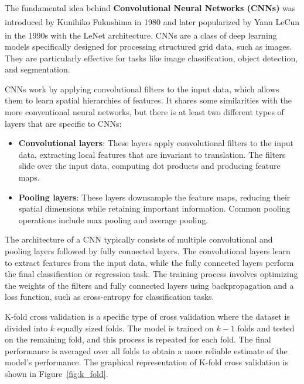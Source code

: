 The fundamental idea behind \textbf{Convolutional Neural Networks (CNNs)} was introduced by Kunihiko Fukushima\textsuperscript{\cite{Fukushima-1987}}
in 1980 and later popularized by Yann LeCun in the 1990s with the LeNet architecture\textsuperscript{\cite{Lecun-et-al-1998}}. CNNs are a class of
deep learning models specifically designed for processing structured grid data, such as images. They are particularly effective for
tasks like image classification, object detection, and segmentation.

CNNs work by applying convolutional filters to the input data, which allows them to learn spatial hierarchies of features.
It shares some similarities with the more conventional neural networks, but there is at least two different types
of layers that are specific to CNNs:

\begin{itemize}
	\item \textbf{Convolutional layers}: These layers apply convolutional filters to the input data, extracting local features
	      that are invariant to translation. The filters slide over the input data, computing dot products and producing feature maps.
	\item \textbf{Pooling layers}: These layers downsample the feature maps, reducing their spatial dimensions while retaining important
	      information. Common pooling operations include max pooling and average pooling.
\end{itemize}

The architecture of a CNN typically consists of multiple convolutional and pooling layers followed by fully connected layers.
The convolutional layers learn to extract features from the input data, while the fully connected layers perform the final classification
or regression task. The training process involves optimizing the weights of the filters and fully connected layers using backpropagation
and a loss function, such as cross-entropy for classification tasks.

\label{subsubsec:k_fold_cross_validation}

K-fold cross validation is a specific type of cross validation where the dataset is divided into $k$ equally sized folds. The model is trained
on $k-1$ folds and tested on the remaining fold, and this process is repeated for each fold. The final performance is averaged over all folds
to obtain a more reliable estimate of the model's performance. The graphical representation of K-fold cross validation is shown in Figure~\ref{fig:k_fold}.

